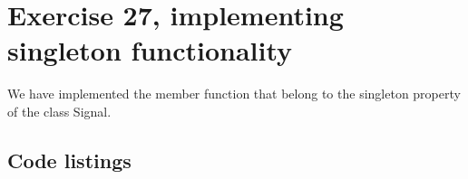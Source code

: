 \documentclass[11pt]{article}
\begin{document}
\section*{Exercise 27, implementing singleton functionality}
We have implemented the member function that belong to the singleton property of the class Signal.

\subsection*{Code listings}


\end{document}
